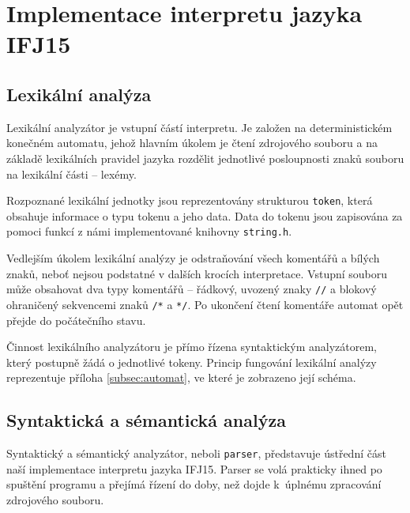 \documentclass[a4paper, 12pt]{article}
\begin{document}
\newpage

\section{Implementace interpretu jazyka IFJ15} \label{implementace}
\subsection{Lexikální analýza} \label{lexer}

Lexikální analyzátor je vstupní částí interpretu. Je založen na deterministickém
konečném automatu, jehož hlavním úkolem je čtení zdrojového souboru a na základě
lexikálních pravidel jazyka rozdělit jednotlivé posloupnosti znaků
souboru na lexikální části -- lexémy.

Rozpoznané lexikální jednotky jsou reprezentovány strukturou \texttt{token},
která obsahuje informace o typu tokenu a jeho data. Data do tokenu jsou
zapisována za pomoci funkcí z námi implementované knihovny \texttt{string.h}.

Vedlejším úkolem lexikální analýzy je odstraňování všech komentářů a bílých
znaků, neboť nejsou podstatné v dalších krocích interpretace. Vstupní souboru
může obsahovat dva typy komentářů -- řádkový, uvozený znaky
\texttt{//} a blokový ohraničený sekvencemi znaků
\texttt{/*} a \texttt{*/}. Po ukončení čtení komentáře automat opět přejde
do počátečního stavu.

Činnost lexikálního analyzátoru je přímo řízena syntaktickým analyzátorem, který
postupně žádá o jednotlivé tokeny. Princip fungování lexikální analýzy
reprezentuje příloha \ref{subsec:automat}, ve které je zobrazeno její schéma.

\subsection{Syntaktická a sémantická analýza} \label{parser}

Syntaktický a sémantický analyzátor, neboli \texttt{parser}, představuje ústřední
část naší implementace interpretu jazyka IFJ15. Parser se volá prakticky ihned po
spuštění programu a přejímá řízení do doby, než dojde k~úplnému zpracování
zdrojového souboru.
\end{document}
